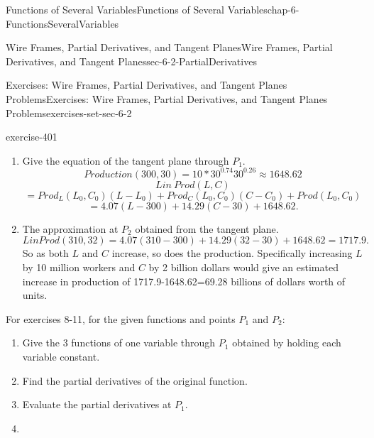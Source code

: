 \documentclass[oneside,10pt,]{book}
\numberwithin{equation}{section}
\begin{document}
\begin{chapterptx}{Functions of Several Variables}{}{Functions of Several Variables}{}{}{chap-6-FunctionsSeveralVariables}
\begin{sectionptx}{Wire Frames, Partial Derivatives, and Tangent Planes}{}{Wire Frames, Partial Derivatives, and Tangent Planes}{}{}{sec-6-2-PartialDerivatives}
\begin{exercises-subsection-numberless}{Exercises: Wire Frames, Partial Derivatives, and Tangent Planes Problems}{}{Exercises: Wire Frames, Partial Derivatives, and Tangent Planes Problems}{}{}{exercises-set-sec-6-2}
\begin{exercisegroup}
\begin{divisionexerciseeg}{7}{}{}{exercise-401}
\begin{enumerate}[label=(\alph*)]
%
\begin{equation*}
Production_C  (300, 30)=(2.6 \frac{300^{0.74}}{30^{0.74}}
\approx 14.29
\end{equation*}
\item\hypertarget{li-635}{}\hypertarget{p-2295}{}%
Give the equation of the tangent plane through \(P_1\).%
%
\begin{equation*}
Production(300,30)=10*30^{0.74}  30^{0.26}\approx 1648.62
\end{equation*}
%
\begin{equation*}
Lin\ Prod(L,C)
\end{equation*}
%
\begin{equation*}
=Prod_L (L_0,C_0 )(L-L_0 )+Prod_C (L_0,C_0 )(C-C_0 )+Prod(L_0,C_0 )
\end{equation*}
%
\begin{equation*}
=4.07(L-300)+14.29(C-30)+1648.62.
\end{equation*}
\item\hypertarget{li-636}{}\hypertarget{p-2296}{}%
The approximation at \(P_2\) obtained from the tangent plane.%
%
\begin{equation*}
Lin Prod(310, 32)   =4.07(310-300)+14.29(32-30)+1648.62=1717.9.
\end{equation*}
\hypertarget{p-2297}{}%
So as both \(L\) and \(C\) increase, so does the production. Specifically increasing \(L\) by 10 million workers and \(C\) by 2 billion dollars would give an estimated increase in production of 1717.9-1648.62=69.28 billions of dollars worth of units.%
\end{enumerate}
\end{divisionexerciseeg}%
\end{exercisegroup}
\par\medskip\noindent
\par\medskip\noindent%
\hypertarget{exercisegroup-28}{}%
\hypertarget{p-2298}{}%
For exercises 8-11, for the given functions and points \(P_1\) and \(P_2\):%
\leavevmode%
\begin{enumerate}[label=(\alph*)]
\item\hypertarget{li-637}{}\hypertarget{p-2299}{}%
Give the 3 functions of one variable through \(P_1\) obtained by holding each variable constant.%
\item\hypertarget{li-638}{}\hypertarget{p-2300}{}%
Find the partial derivatives of the original function.%
\item\hypertarget{li-639}{}\hypertarget{p-2301}{}%
Evaluate the partial derivatives at \(P_1\).%
\item\hypertarget{li-640}{}\hypertarget{p-2302}{}%

\end{enumerate}
\end{exercises-subsection-numberless}
\end{sectionptx}
\end{chapterptx}
\end{document}
